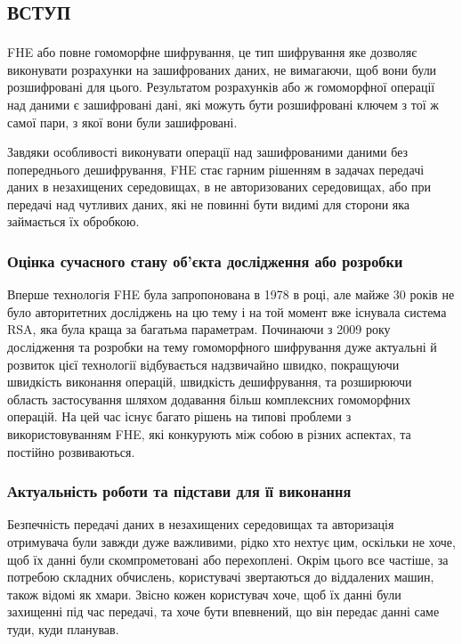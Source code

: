 \newpage
{}
\chapter*{\textsc{вступ}}



FHE або повне гомоморфне шифрування, це тип шифрування яке дозволяє виконувати розрахунки
на зашифрованих даних, не вимагаючи, щоб вони були розшифровані для цього. Результатом
розрахунків або ж гомоморфної операції над даними є зашифровані дані, які можуть бути
розшифровані ключем з тої ж самої пари, з якої вони були зашифровані.

Завдяки особливості виконувати операції над зашифрованими даними без попереднього
дешифрування, FHE стає гарним рішенням в задачах передачі даних в незахищених
середовищах, в не авторизованих середовищах, або при передачі над чутливих даних, які
не повинні бути видимі для сторони яка займається їх обробкою.

\subsection*{Оцінка сучасного стану об’єкта дослідження або розробки}
Вперше технологія FHE була запропонована в 1978 в році, але майже 30 років не було
авторитетних досліджень на цю тему і на той момент вже існувала система RSA, яка була
краща за багатьма параметрам. Починаючи з 2009 року дослідження та розробки на
тему гомоморфного шифрування дуже актуальні й розвиток цієї технології відбувається
надзвичайно швидко, покращуючи швидкість виконання операцій, швидкість дешифрування, та
розширюючи область застосування шляхом додавання більш комплексних гомоморфних операцій.
На цей час існує багато рішень на типові проблеми з використовуванням FHE, які
конкурують між собою в різних аспектах, та постійно розвиваються.

\subsection*{Актуальність роботи та підстави для її виконання}
Безпечність передачі даних в незахищених середовищах та авторизація отримувача були 
завжди дуже важливими, рідко хто нехтує цим, оскільки не хоче, щоб їх данні були
скомпрометовані або перехоплені. Окрім цього все частіше, за потребою складних
обчислень, користувачі звертаються до віддалених машин, також відомі як хмари. Звісно
кожен користувач хоче, щоб їх данні були захищенні під час передачі, та хоче бути
впевнений, що він передає данні саме туди, куди планував.

